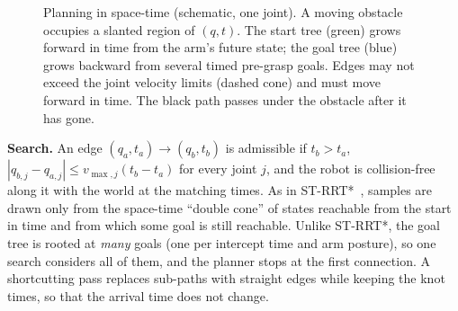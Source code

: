 \documentclass[conference]{IEEEtran}
\begin{document}
\begin{figure}[t]
  \centering
  \caption{Planning in space-time (schematic, one joint). A moving obstacle occupies a slanted region of
  $(q,t)$. The start tree (green) grows forward in time from the arm's future state; the goal tree
  (blue) grows backward from several timed pre-grasp goals. Edges may not exceed the joint velocity
  limits (dashed cone) and must move forward in time. The black path passes under the obstacle after it
  has gone.}
  \label{fig:spacetime}
\end{figure}

\textbf{Search.} An edge $(q_a,t_a)\to(q_b,t_b)$ is admissible if $t_b>t_a$, $|q_{b,j}-q_{a,j}| \le
v_{\max,j}(t_b-t_a)$ for every joint $j$, and the robot is collision-free along it with the world at the
matching times. As in ST-RRT*~\cite{grothe2022strrt}, samples are drawn only from the space-time
``double cone'' of states reachable from the start in time and from which some goal is still reachable.
Unlike ST-RRT*, the goal tree is rooted at \emph{many} goals (one per intercept time and arm posture), so
one search considers all of them, and the planner stops at the first connection. A shortcutting pass
replaces sub-paths with straight edges while keeping the knot times, so that the arrival time does not
change.
\end{document}

